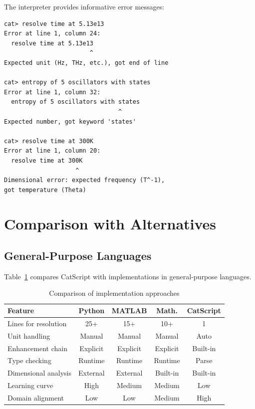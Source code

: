 \documentclass[twocolumn,10pt]{article}
\begin{document}
The interpreter provides informative error messages:

\begin{verbatim}
cat> resolve time at 5.13e13
Error at line 1, column 24:
  resolve time at 5.13e13
                        ^
Expected unit (Hz, THz, etc.), got end of line

cat> entropy of 5 oscillators with states
Error at line 1, column 32:
  entropy of 5 oscillators with states
                                ^
Expected number, got keyword 'states'

cat> resolve time at 300K
Error at line 1, column 20:
  resolve time at 300K
                    ^
Dimensional error: expected frequency (T^-1),
got temperature (Theta)
\end{verbatim}

\section{Comparison with Alternatives}
\label{sec:related}

\subsection{General-Purpose Languages}

Table~\ref{tab:comparison} compares CatScript with implementations in general-purpose languages.

\begin{table}[H]
\centering
\caption{Comparison of implementation approaches}
\label{tab:comparison}
\begin{tabular}{@{}lcccc@{}}
\toprule
Feature & Python & MATLAB & Math. & CatScript \\
\midrule
Lines for resolution & 25+ & 15+ & 10+ & 1 \\
Unit handling & Manual & Manual & Manual & Auto \\
Enhancement chain & Explicit & Explicit & Explicit & Built-in \\
Type checking & Runtime & Runtime & Runtime & Parse \\
Dimensional analysis & External & External & Built-in & Built-in \\
Learning curve & High & Medium & Medium & Low \\
Domain alignment & Low & Low & Medium & High \\
\bottomrule
\end{tabular}
\end{table}
\end{document}
